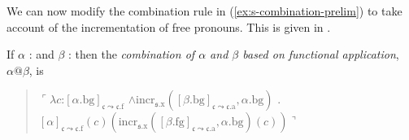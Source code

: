 We can now modify the combination rule in
(\ref{ex:s-combination-prelim}) to take account of the incrementation
of free pronouns. This is given in \nexteg{}.
\begin{ex}
If $\alpha$ :  
and $\beta$ : 
                         then the \textit{combination of $\alpha$ and
    $\beta$  based on functional application}, $\alpha\text{@}\beta$, is
  \begin{quote}
   $\ulcorner\lambda c$:$[\alpha.\text{bg}]_{\mathfrak{c}\leadsto\mathfrak{c}.\text{f}}$
      \d{$\wedge$}$\mathrm{incr}_{\mathfrak{s}.\text{x}}([\beta.\text{bg}]_{\mathfrak{c}\leadsto\mathfrak{c}.\text{a}},\alpha.\text{bg})$
      . \\ \hspace*{2em}$[\alpha]_{\mathfrak{c}\leadsto\mathfrak{c}.\text{f}}(c)(\mathrm{incr}_{\mathfrak{s}.\text{x}}([\beta.\text{fg}]_{\mathfrak{c}\leadsto\mathfrak{c}.\text{a}},\alpha.\text{bg})(c))\urcorner$
      
\end{quote}

\label{ex:s-combination} 
\end{ex}

  
  
